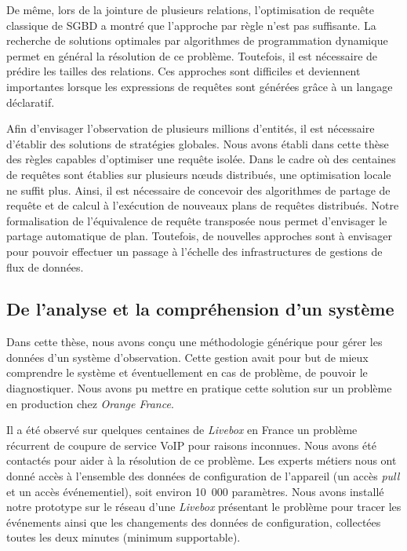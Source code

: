 De même, lors de la jointure de plusieurs relations, l'optimisation de requête classique de SGBD a montré que l'approche par règle n'est pas suffisante. La recherche de solutions optimales par algorithmes de programmation dynamique permet en général la résolution de ce problème. Toutefois, il est nécessaire de prédire les tailles des relations. Ces approches sont difficiles et deviennent importantes lorsque les expressions de requêtes sont générées grâce à un langage déclaratif.

Afin d'envisager l'observation de plusieurs millions d'entités, il est nécessaire d'établir des solutions de stratégies globales. Nous avons établi dans cette thèse des règles capables d'optimiser une requête isolée. Dans le cadre où des centaines de requêtes sont établies sur plusieurs nœuds distribués, une optimisation locale ne suffit plus. Ainsi, il est nécessaire de concevoir des algorithmes de partage de requête et de calcul à l'exécution de nouveaux plans de requêtes distribués. Notre formalisation de l'équivalence de requête transposée nous permet d'envisager le partage automatique de plan. Toutefois, de nouvelles approches sont à envisager pour pouvoir effectuer un passage à l'échelle des infrastructures de gestions de flux de données.

\subsection{De l'analyse et la compréhension d'un système}
Dans cette thèse, nous avons conçu une méthodologie générique pour gérer les données d'un système d'observation. Cette gestion avait pour but de mieux comprendre le système et éventuellement en cas de problème, de pouvoir le diagnostiquer. Nous avons pu mettre en pratique cette solution sur un problème en production chez \textit{Orange France}.

Il a été observé sur quelques centaines de \textit{Livebox} en France un problème récurrent de coupure de service VoIP pour raisons inconnues. Nous avons été contactés pour aider à la résolution de ce problème. Les experts métiers nous ont donné accès à l'ensemble des données de configuration de l'appareil (un accès \textit{pull} et un accès événementiel), soit environ 10~000 paramètres. Nous avons installé notre prototype sur le réseau d'une \textit{Livebox} présentant le problème pour tracer les événements ainsi que les changements des données de configuration, collectées toutes les deux minutes (minimum supportable).

